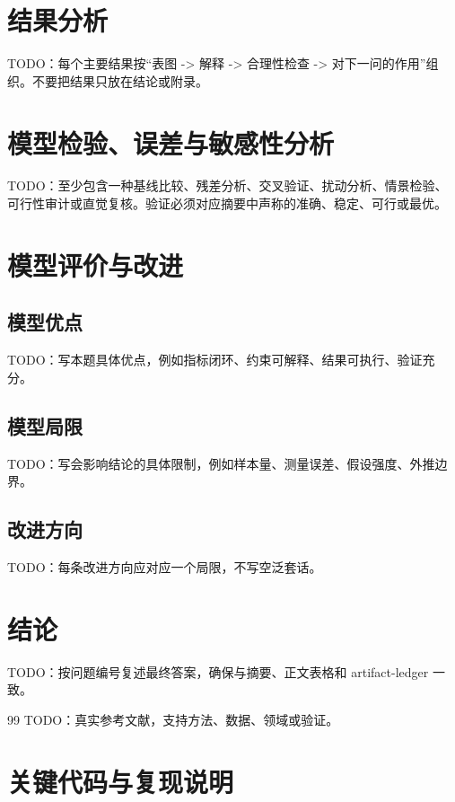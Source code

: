 \documentclass{ctexart}
\begin{document}
\section{结果分析}

TODO：每个主要结果按“表图 -> 解释 -> 合理性检查 -> 对下一问的作用”组织。不要把结果只放在结论或附录。

\section{模型检验、误差与敏感性分析}

TODO：至少包含一种基线比较、残差分析、交叉验证、扰动分析、情景检验、可行性审计或直觉复核。验证必须对应摘要中声称的准确、稳定、可行或最优。

\section{模型评价与改进}

\subsection{模型优点}
TODO：写本题具体优点，例如指标闭环、约束可解释、结果可执行、验证充分。

\subsection{模型局限}
TODO：写会影响结论的具体限制，例如样本量、测量误差、假设强度、外推边界。

\subsection{改进方向}
TODO：每条改进方向应对应一个局限，不写空泛套话。

\section{结论}

TODO：按问题编号复述最终答案，确保与摘要、正文表格和 artifact-ledger 一致。

\begin{thebibliography}{99}
 TODO：真实参考文献，支持方法、数据、领域或验证。
\end{thebibliography}

\appendix
\section{关键代码与复现说明}
\end{document}
